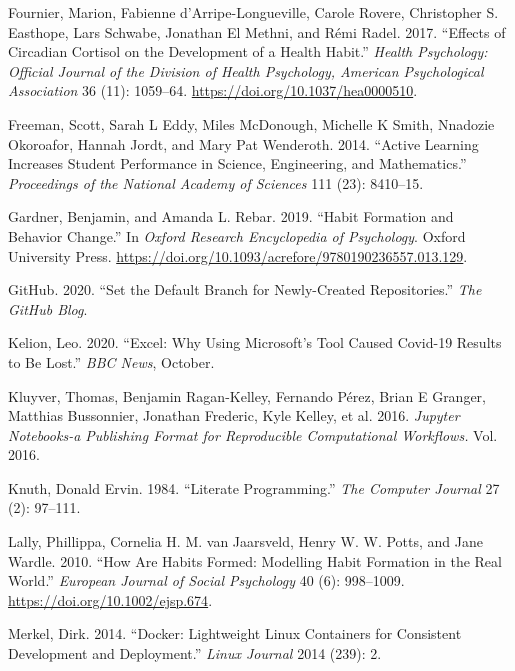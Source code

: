 \documentclass[
  12 pt,
]{paper}
\newlength{\cslhangindent}
\newlength{\cslentryspacingunit} %
\newenvironment{CSLReferences}[2] %
 {%
  \setlength{\parindent}{0pt}
  \ifodd #1
  \let\oldpar\par
  \def\par{\hangindent=\cslhangindent\oldpar}
  \fi
  \setlength{\parskip}{#2\cslentryspacingunit}
 }%
 {}
\begin{document}
\begin{CSLReferences}{1}{0}
\leavevmode{}%
Fournier, Marion, Fabienne d'Arripe-Longueville, Carole Rovere, Christopher S. Easthope, Lars Schwabe, Jonathan El Methni, and Rémi Radel. 2017. {``Effects of Circadian Cortisol on the Development of a Health Habit.''} \emph{Health Psychology: Official Journal of the Division of Health Psychology, American Psychological Association} 36 (11): 1059--64. \url{https://doi.org/10.1037/hea0000510}.

\leavevmode{}%
Freeman, Scott, Sarah L Eddy, Miles McDonough, Michelle K Smith, Nnadozie Okoroafor, Hannah Jordt, and Mary Pat Wenderoth. 2014. {``Active Learning Increases Student Performance in Science, Engineering, and Mathematics.''} \emph{Proceedings of the National Academy of Sciences} 111 (23): 8410--15.

\leavevmode{}%
Gardner, Benjamin, and Amanda L. Rebar. 2019. {``Habit {Formation} and {Behavior Change}.''} In \emph{Oxford {Research Encyclopedia} of {Psychology}}. {Oxford University Press}. \url{https://doi.org/10.1093/acrefore/9780190236557.013.129}.

\leavevmode{}%
GitHub. 2020. {``Set the Default Branch for Newly-Created Repositories.''} \emph{The GitHub Blog}.

\leavevmode{}%
Kelion, Leo. 2020. {``Excel: {Why} Using {Microsoft}'s Tool Caused {Covid}-19 Results to Be Lost.''} \emph{BBC News}, October.

\leavevmode{}%
Kluyver, Thomas, Benjamin Ragan-Kelley, Fernando Pérez, Brian E Granger, Matthias Bussonnier, Jonathan Frederic, Kyle Kelley, et al. 2016. \emph{Jupyter Notebooks-a Publishing Format for Reproducible Computational Workflows.} Vol. 2016.

\leavevmode{}%
Knuth, Donald Ervin. 1984. {``Literate Programming.''} \emph{The Computer Journal} 27 (2): 97--111.

\leavevmode{}%
Lally, Phillippa, Cornelia H. M. van Jaarsveld, Henry W. W. Potts, and Jane Wardle. 2010. {``How Are Habits Formed: {Modelling} Habit Formation in the Real World.''} \emph{European Journal of Social Psychology} 40 (6): 998--1009. \url{https://doi.org/10.1002/ejsp.674}.

\leavevmode{}%
Merkel, Dirk. 2014. {``Docker: Lightweight Linux Containers for Consistent Development and Deployment.''} \emph{Linux Journal} 2014 (239): 2.


\end{CSLReferences}
\end{document}
